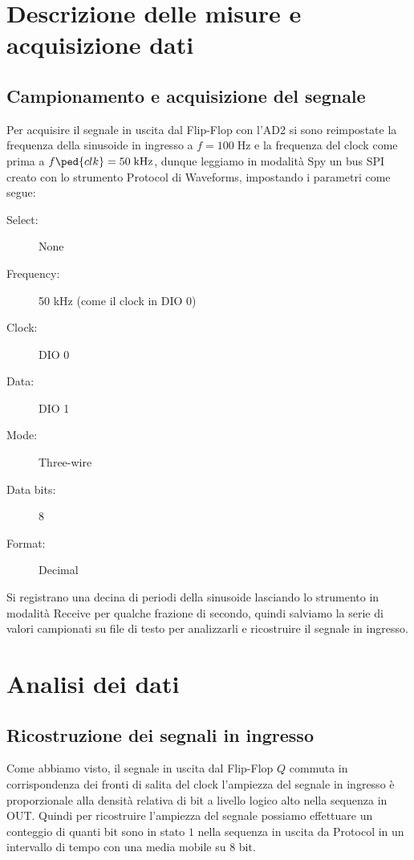 \documentclass[10pt, a4paper, italian]{article}
\begin{document}
\section{Descrizione delle misure e acquisizione dati}
\subsection{Campionamento e acquisizione del segnale}
Per acquisire il segnale in uscita dal Flip-Flop con l'AD2 si sono reimpostate
la frequenza della sinusoide in ingresso a $f = 100 \; \si{\Hz}$ e la
frequenza del clock come prima a $f\ped{clk} = 50 \; \si{k\Hz}$, dunque
leggiamo in modalità Spy un bus SPI creato con lo strumento Protocol di
Waveforms, impostando i parametri come segue:
\begin{description}
\item[Select:] None
\item[Frequency:] 50 kHz (come il clock in DIO 0)
\item[Clock:] DIO 0
\item[Data:] DIO 1
\item[Mode:] Three-wire
\item[Data bits:] 8
\item[Format:] Decimal
\end{description}

Si registrano una decina di periodi della sinusoide lasciando lo strumento in
modalità Receive per qualche frazione di secondo, quindi salviamo la serie
di valori campionati su file di testo per analizzarli e ricostruire il segnale
in ingresso.

\section{Analisi dei dati}
\subsection{Ricostruzione dei segnali in ingresso}
Come abbiamo visto, il segnale in uscita dal Flip-Flop $Q$ commuta in
corrispondenza dei fronti di salita del clock l'ampiezza del segnale in
ingresso è proporzionale alla densità relativa di bit a livello logico alto
nella sequenza in OUT. Quindi per ricostruire l'ampiezza del segnale possiamo
effettuare un conteggio di quanti bit sono in stato $1$ nella sequenza in
uscita da Protocol in un intervallo di tempo con una media mobile su $8$ bit.
\end{document}
